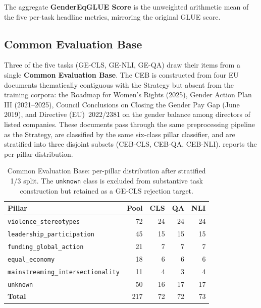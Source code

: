 \documentclass[pdflatex, sn-apa]{sn-jnl}%
\theoremstyle{thmstyleone}%
\theoremstyle{thmstyletwo}%
\theoremstyle{thmstylethree}%
\begin{document}
The aggregate \textbf{GenderEqGLUE Score} is the unweighted arithmetic mean of
the five per-task headline metrics, mirroring the original GLUE score.

\subsection{Common Evaluation Base}
\label{sec:bench:ceb}

Three of the five tasks (GE-CLS, GE-NLI, GE-QA) draw their items from a single
\textbf{Common Evaluation Base}. The CEB is constructed from four EU documents
thematically contiguous with the Strategy but absent from the training corpora:
the Roadmap for Women's Rights (2025), Gender Action Plan III (2021--2025),
Council Conclusions on Closing the Gender Pay Gap (June 2019), and Directive
(EU)~2022/2381 on the gender balance among directors of listed companies. These
documents pass through the same preprocessing pipeline as the Strategy, are
classified by the same six-class pillar classifier, and are stratified into
three disjoint subsets (CEB-CLS, CEB-QA, CEB-NLI).  reports the
per-pillar distribution.

\begin{table}[h]
\centering
\caption{Common Evaluation Base: per-pillar distribution after stratified
1/3 split. The \texttt{unknown} class is excluded from substantive task
construction but retained as a GE-CLS rejection target.}
\label{tab:ceb}
\small
\begin{tabular}{@{}lrrrr@{}}
\toprule
Pillar                                & Pool & CLS & QA & NLI \\
\midrule
\texttt{violence\_stereotypes}        & 72   & 24  & 24 & 24  \\
\texttt{leadership\_participation}    & 45   & 15  & 15 & 15  \\
\texttt{funding\_global\_action}      & 21   &  7  &  7 &  7  \\
\texttt{equal\_economy}               & 18   &  6  &  6 &  6  \\
\texttt{mainstreaming\_intersectionality} & 11 & 4  &  3 &  4  \\
\texttt{unknown}                      & 50   & 16  & 17 & 17  \\
\midrule
\textbf{Total}                        & 217  & 72  & 72 & 73  \\
\bottomrule
\end{tabular}
\end{table}
\end{document}
